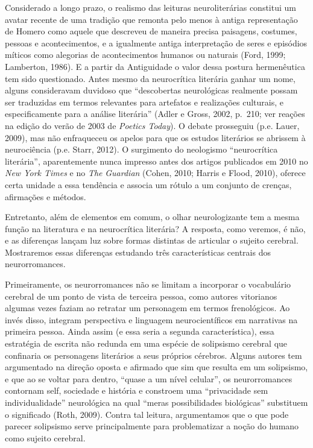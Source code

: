 Considerado a longo prazo, o realismo das leituras neuroliterárias
constitui um avatar recente de uma tradição que remonta pelo menos à
antiga representação de Homero como aquele que descreveu de maneira
precisa paisagens, costumes, pessoas e acontecimentos, e a igualmente
antiga interpretação de seres e episódios míticos como alegorias de
acontecimentos humanos ou naturais (Ford, 1999; Lamberton, 1986). E a
partir da Antiguidade o valor dessa postura hermenêutica tem sido
questionado. Antes mesmo da neurocrítica literária ganhar um nome,
alguns consideravam duvidoso que ``descobertas neurológicas realmente
possam ser traduzidas em termos relevantes para artefatos e realizações
culturais, e especificamente para a análise literária'' (Adler e Gross,
2002, p.~210; ver reações na edição do verão de 2003 de \emph{Poetics
Today}). O debate prosseguiu (p.e. Lauer, 2009), mas não enfraqueceu os
apelos para que os estudos literários se abrissem à neurociência (p.e.
Starr, 2012). O surgimento do neologismo ``neurocrítica literária'',
aparentemente nunca impresso antes dos artigos publicados em 2010 no
\emph{New York Times} e no \emph{The} \emph{Guardian} (Cohen, 2010;
Harris e Flood, 2010), oferece certa unidade a essa tendência e associa
um rótulo a um conjunto de crenças, afirmações e métodos.

Entretanto, além de elementos em comum, o olhar neurologizante tem a
mesma função na literatura e na neurocrítica literária? A resposta, como
veremos, é não, e as diferenças lançam luz sobre formas distintas de
articular o sujeito cerebral. Mostraremos essas diferenças estudando
três características centrais dos neurorromances.

Primeiramente, os neurorromances não se limitam a incorporar o
vocabulário cerebral de um ponto de vista de terceira pessoa, como
autores vitorianos algumas vezes faziam ao retratar um personagem em
termos frenológicos. Ao invés disso, integram perspectiva e linguagem
neurocientíficos em narrativas na primeira pessoa. Ainda assim (e essa
seria a segunda característica), essa estratégia de escrita não redunda
em uma espécie de solipsismo cerebral que confinaria os personagens
literários a seus próprios cérebros. Alguns autores tem argumentado na
direção oposta e afirmado que sim que resulta em um solipsismo, e que ao
se voltar para dentro, ``quase a um nível celular'', os neurorromances
contornam self, sociedade e história e constroem uma ``privacidade sem
individualidade'' neurológica na qual ``meras possibilidades
biológicas'' substituem o significado (Roth, 2009). Contra tal leitura,
argumentamos que o que pode parecer solipsismo serve principalmente para
problematizar a noção do humano como sujeito cerebral.

